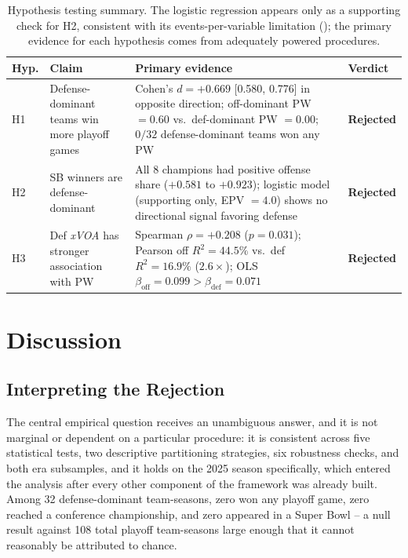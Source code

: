 \documentclass[12pt,a4paper]{article}
\newcommand{\xvoa}{\textit{xVOA}}
\begin{document}
\begin{table}[htbp]
  \centering
  \caption{Hypothesis testing summary. The logistic regression appears only as a supporting check for H2, consistent with its events-per-variable limitation (); the primary evidence for each hypothesis comes from adequately powered procedures.}
  \label{tab:hypothesis-summary}
  \small
  \begin{tabularx}{\textwidth}{l p{3.0cm} X l}
    \toprule
    \textbf{Hyp.} & \textbf{Claim} & \textbf{Primary evidence} & \textbf{Verdict} \\
    \midrule
    H1 & Defense-dominant teams win more playoff games
      & Cohen's $d=+0.669$ [0.580, 0.776] in opposite direction; off-dominant PW $=0.60$ vs.\ def-dominant PW $=0.00$; $0/32$ defense-dominant teams won any PW
      & \textbf{Rejected} \\[8pt]
    H2 & SB winners are defense-dominant
      & All 8 champions had positive offense share ($+0.581$ to $+0.923$); logistic model (supporting only, EPV $=4.0$) shows no directional signal favoring defense
      & \textbf{Rejected} \\[8pt]
    H3 & Def \xvoa{} has stronger association with PW
      & Spearman $\rho=+0.208$ ($p=0.031$); Pearson off $R^2=44.5\%$ vs.\ def $R^2=16.9\%$ ($2.6\times$); OLS $\beta_{\text{off}}=0.099>\beta_{\text{def}}=0.071$
      & \textbf{Rejected} \\
    \bottomrule
  \end{tabularx}
\end{table}

\section{Discussion}
\label{sec:discussion}

\subsection{Interpreting the Rejection}

The central empirical question receives an unambiguous answer, and it is not marginal or dependent on a particular procedure: it is consistent across five statistical tests, two descriptive partitioning strategies, six robustness checks, and both era subsamples, and it holds on the 2025 season specifically, which entered the analysis after every other component of the framework was already built. Among 32 defense-dominant team-seasons, zero won any playoff game, zero reached a conference championship, and zero appeared in a Super Bowl -- a null result against 108 total playoff team-seasons large enough that it cannot reasonably be attributed to chance.
\end{document}
